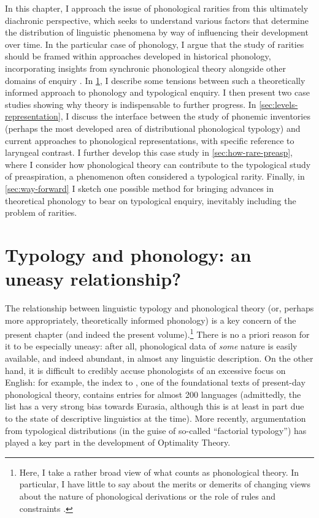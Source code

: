 \documentclass[output=paper,colorlinks,citecolor=brown]{langscibook}
\begin{document}
In this chapter, I approach the issue of phonological rarities from this ultimately diachronic perspective, which seeks to understand various factors that determine the distribution of linguistic phenomena by way of influencing their development over time. In the particular case of phonology, I argue that the study of rarities should be framed within approaches developed in historical phonology, incorporating insights from synchronic phonological theory alongside other domains of enquiry \parencite{salmons2021sound}. In \cref{typology-in-phonology}, I describe some tensions between such a theoretically informed approach to phonology and typological enquiry. I then present two case studies showing why theory is indispensable to further progress. In \cref{sec:levels-representation}, I discuss the interface between the study of phonemic inventories (perhaps the most developed area of distributional phonological typology) and current approaches to  phonological representations, with specific reference to laryngeal contrast. I further develop this case study in \cref{sec:how-rare-preasp}, where I consider how phonological theory can contribute to the typological study of preaspiration, a phenomenon often considered a typological rarity. Finally, in \cref{sec:way-forward} I sketch one possible method for bringing advances in theoretical phonology to bear on typological enquiry, inevitably including the problem of rarities.

\section{Typology and phonology: an uneasy relationship?}
\label{typology-in-phonology}

The relationship between linguistic typology and phonological theory (or, perhaps more appropriately, theoretically informed phonology) is a key concern of the present chapter (and indeed the present volume).\footnote{Here, I take a rather broad view of what counts as phonological theory. In particular, I have little to say about the merits or demerits of changing views about the nature of phonological derivations or the role of rules and constraints \parencite{anderson2021phonology, dresher2018oxford}.} There is no a priori reason for it to be especially uneasy: after all, phonological data of \emph{some} nature is easily available, and indeed abundant, in almost any linguistic description. On the other hand, it is difficult to credibly accuse phonologists of an excessive focus on English: for example, the index to \textcite{Tru39}, one of the foundational texts of present\hyp day phonological theory, contains entries for almost 200 languages (admittedly, the list has a very strong bias towards Eurasia, although this is at least in part due to the state of descriptive linguistics at the time). More recently, argumentation from typological distributions (in the guise of so\hyp called \enquote{factorial typology}) has played a key part in the development of Optimality Theory.
\end{document}
